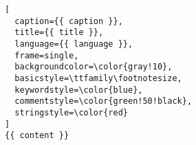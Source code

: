 \begin{lstlisting}[
  caption={{ caption }},
  title={{ title }},
  language={{ language }},
  frame=single,
  backgroundcolor=\color{gray!10},
  basicstyle=\ttfamily\footnotesize,
  keywordstyle=\color{blue},
  commentstyle=\color{green!50!black},
  stringstyle=\color{red}
]
{{ content }}
\end{lstlisting} 